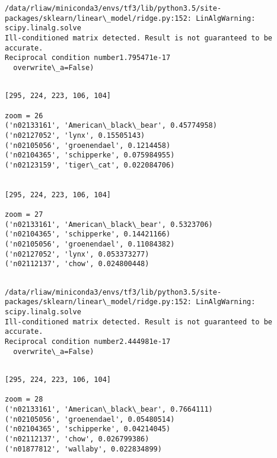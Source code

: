 \documentclass[11pt]{article}
\begin{document}
    \begin{Verbatim}[commandchars=\\\{\}]
/data/rliaw/miniconda3/envs/tf3/lib/python3.5/site-packages/sklearn/linear\_model/ridge.py:152: LinAlgWarning: scipy.linalg.solve
Ill-conditioned matrix detected. Result is not guaranteed to be accurate.
Reciprocal condition number1.795471e-17
  overwrite\_a=False)

    \end{Verbatim}

    \begin{Verbatim}[commandchars=\\\{\}]

[295, 224, 223, 106, 104]

zoom = 26
('n02133161', 'American\_black\_bear', 0.45774958)
('n02127052', 'lynx', 0.15505143)
('n02105056', 'groenendael', 0.1214458)
('n02104365', 'schipperke', 0.075984955)
('n02123159', 'tiger\_cat', 0.022084706)


[295, 224, 223, 106, 104]

zoom = 27
('n02133161', 'American\_black\_bear', 0.5323706)
('n02104365', 'schipperke', 0.14421166)
('n02105056', 'groenendael', 0.11084382)
('n02127052', 'lynx', 0.053373277)
('n02112137', 'chow', 0.024800448)


    \end{Verbatim}

    \begin{Verbatim}[commandchars=\\\{\}]
/data/rliaw/miniconda3/envs/tf3/lib/python3.5/site-packages/sklearn/linear\_model/ridge.py:152: LinAlgWarning: scipy.linalg.solve
Ill-conditioned matrix detected. Result is not guaranteed to be accurate.
Reciprocal condition number2.444981e-17
  overwrite\_a=False)

    \end{Verbatim}

    \begin{Verbatim}[commandchars=\\\{\}]

[295, 224, 223, 106, 104]

zoom = 28
('n02133161', 'American\_black\_bear', 0.7664111)
('n02105056', 'groenendael', 0.05480514)
('n02104365', 'schipperke', 0.04214045)
('n02112137', 'chow', 0.026799386)
('n01877812', 'wallaby', 0.022834899)


    \end{Verbatim}
\end{document}
